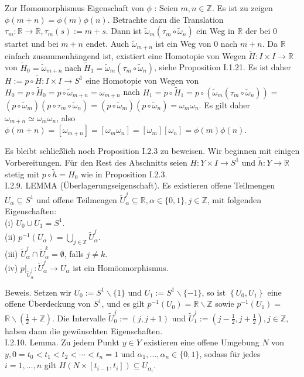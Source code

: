 \documentclass[10pt]{article}
\begin{document}
Zur Homomorphismus Eigenschaft von $\phi$ : Seien $m, n \in \mathbb{Z}$. Es ist zu zeigen $\phi(m+n)=\phi(m) \phi(n)$. Betrachte dazu die Translation $\tau_{m}: \mathbb{R} \rightarrow \mathbb{R}, \tau_{m}(s):=m+s$. Dann ist $\tilde{\omega}_{m}\left(\tau_{m} \circ \tilde{\omega}_{n}\right)$ ein Weg in $\mathbb{R}$ der bei 0 startet und bei $m+n$ endet. Auch $\tilde{\omega}_{m+n}$ ist ein Weg von 0 nach $m+n$. Da $\mathbb{R}$ einfach zusammenhängend ist, existiert eine Homotopie von Wegen $\tilde{H}: I \times I \rightarrow \mathbb{R}$ von $\tilde{H}_{0}=\tilde{\omega}_{m+n} \operatorname{nach} \tilde{H}_{1}=\tilde{\omega}_{m}\left(\tau_{m} \circ \tilde{\omega}_{n}\right)$, siehe Proposition I.1.21. Es ist daher $H:=p \circ \tilde{H}: I \times I \rightarrow S^{1}$ eine Homotopie von Wegen von $H_{0}=p \circ \tilde{H}_{0}=p \circ \tilde{\omega}_{m+n}=\omega_{m+n}$ nach $H_{1}=p \circ \tilde{H}_{1}=p \circ\left(\tilde{\omega}_{m}\left(\tau_{m} \circ \tilde{\omega}_{n}\right)\right)=$ $\left(p \circ \tilde{\omega}_{m}\right)\left(p \circ \tau_{m} \circ \tilde{\omega}_{n}\right)=\left(p \circ \tilde{\omega}_{m}\right)\left(p \circ \tilde{\omega}_{n}\right)=\omega_{m} \omega_{n}$. Es gilt daher $\omega_{m+n} \simeq \omega_{m} \omega_{n}$, also $\phi(m+n)=\left[\omega_{m+n}\right]=\left[\omega_{m} \omega_{n}\right]=\left[\omega_{m}\right]\left[\omega_{n}\right]=\phi(m) \phi(n)$.

Es bleibt schließlich noch Proposition I.2.3 zu beweisen. Wir beginnen mit einigen Vorbereitungen. Für den Rest des Abschnitts seien $H: Y \times I \rightarrow S^{1}$ und $\tilde{h}: Y \rightarrow \mathbb{R}$ stetig mit $p \circ \tilde{h}=H_{0}$ wie in Proposition I.2.3.\\
I.2.9. LEMMA (Überlagerungseigenschaft). Es existieren offene Teilmengen $U_{\alpha} \subseteq S^{1}$ und offene Teilmengen $\tilde{U}_{\alpha}^{j} \subseteq \mathbb{R}, \alpha \in\{0,1\}, j \in \mathbb{Z}$, mit folgenden Eigenschaften:\\
(i) $U_{0} \cup U_{1}=S^{1}$.\\
(ii) $p^{-1}\left(U_{\alpha}\right)=\bigcup_{j \in \mathbb{Z}} \tilde{U}_{\alpha}^{j}$.\\
(iii) $\tilde{U}_{\alpha}^{j} \cap \tilde{U}_{\alpha}^{k}=\emptyset$, falls $j \neq k$.\\
(iv) $\left.p\right|_{\tilde{U}_{\alpha}^{j}}: \tilde{U}_{\alpha}^{j} \rightarrow U_{\alpha}$ ist ein Homöomorphismus.

Beweis. Setzen wir $U_{0}:=S^{1} \backslash\{1\}$ und $U_{1}:=S^{1} \backslash\{-1\}$, so ist $\left\{U_{0}, U_{1}\right\}$ eine offene Überdeckung von $S^{1}$, und es gilt $p^{-1}\left(U_{0}\right)=\mathbb{R} \backslash \mathbb{Z}$ sowie $p^{-1}\left(U_{1}\right)=$ $\mathbb{R} \backslash\left(\frac{1}{2}+\mathbb{Z}\right)$. Die Intervalle $\tilde{U}_{0}^{j}:=(j, j+1)$ und $\tilde{U}_{1}^{j}:=\left(j-\frac{1}{2}, j+\frac{1}{2}\right), j \in \mathbb{Z}$, haben dann die gewünschten Eigenschaften.\\
I.2.10. Lemma. Zu jedem Punkt $y \in Y$ existieren eine offene Umgebung $N$ von $y, 0=t_{0}<t_{1}<t_{2}<\cdots<t_{n}=1$ und $\alpha_{1}, \ldots, \alpha_{n} \in\{0,1\}$, sodass für jedes $i=1, \ldots, n$ gilt $H\left(N \times\left[t_{i-1}, t_{i}\right]\right) \subseteq U_{\alpha_{i}}$.
\end{document}
